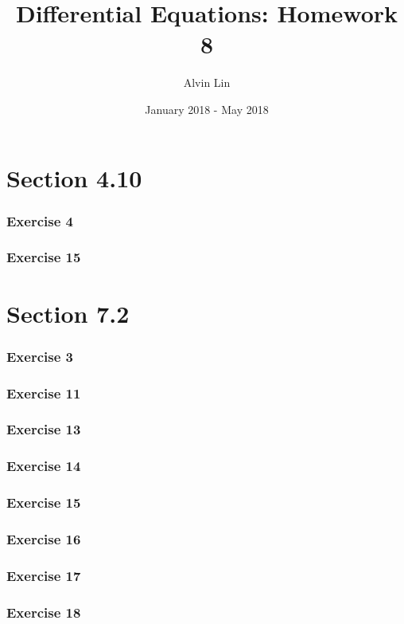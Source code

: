 \documentclass{math}
\title{Differential Equations: Homework 8}
\author{Alvin Lin}
\date{January 2018 - May 2018}
\begin{document}
\maketitle
\clearpage

\section*{Section 4.10}

\subsubsection*{Exercise 4}
\subsubsection*{Exercise 15}

\section*{Section 7.2}

\subsubsection*{Exercise 3}
\subsubsection*{Exercise 11}
\subsubsection*{Exercise 13}
\subsubsection*{Exercise 14}
\subsubsection*{Exercise 15}
\subsubsection*{Exercise 16}
\subsubsection*{Exercise 17}
\subsubsection*{Exercise 18}
\end{document}
